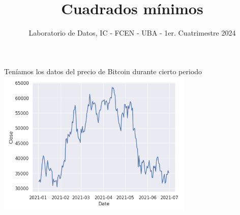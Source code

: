 \documentclass[aspectratio=169, usenames,dvipsnames]{beamer}
\title{Cuadrados mínimos}
\subtitle{Laboratorio de Datos, IC - FCEN - UBA - 1er. Cuatrimestre 2024}
\author{}
\begin{document}
  \frame[c]{\maketitle}




\begin{frame}
    \centering
    Teníamos los datos del precio de Bitcoin durante cierto periodo
    \includegraphics[width=0.7\textwidth]{img/bitcoin.png}
\end{frame}
\end{document}
